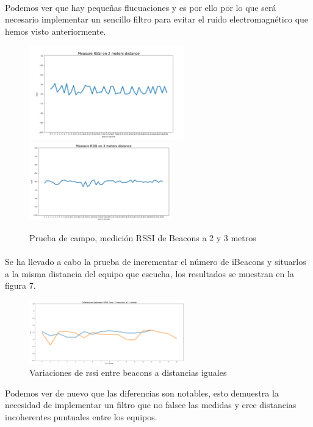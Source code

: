 \documentclass[paper=a4, fontsize=11pt,twoside]{scrartcl}	%
\begin{document}
            \paragraph{}
            Podemos ver que hay pequeñas flucuaciones y es por ello por lo que será necesario implementar un sencillo filtro para
            evitar el ruido electromagnético que hemos visto anteriormente.
            \begin{center}
                \begin{figure}[ht]
                    \centering
                    \includegraphics[width=0.6\textwidth]{1_beacon_2_meters.PNG}
                    \includegraphics[width=0.55\textwidth]{1_beacon_3_meters.PNG}
                    \caption{Prueba de campo, medición RSSI de Beacons a 2 y 3 metros}
                    \label{fig:mesh5}
                \end{figure}
            \end{center}
            \paragraph{}
            Se ha llevado a cabo la prueba de incrementar el número de iBeacons y situarlos a la misma distancia del 
            equipo que escucha, los resultados se muestran en la figura 7.
            \begin{center}
                \begin{figure}[ht]
                    \centering
                    \includegraphics[width=0.6\textwidth]{10min_2beacons_same_distance.PNG}
                    \caption{Variaciones de rssi entre beacons a distancias iguales}
                    \label{fig:mesh6}
                \end{figure}
            \end{center}
            Podemos ver de nuevo que las diferencias son notables, esto demuestra la necesidad de implementar
            un filtro que no falsee las medidas y cree distancias incoherentes puntuales entre los equipos.
\end{document}
